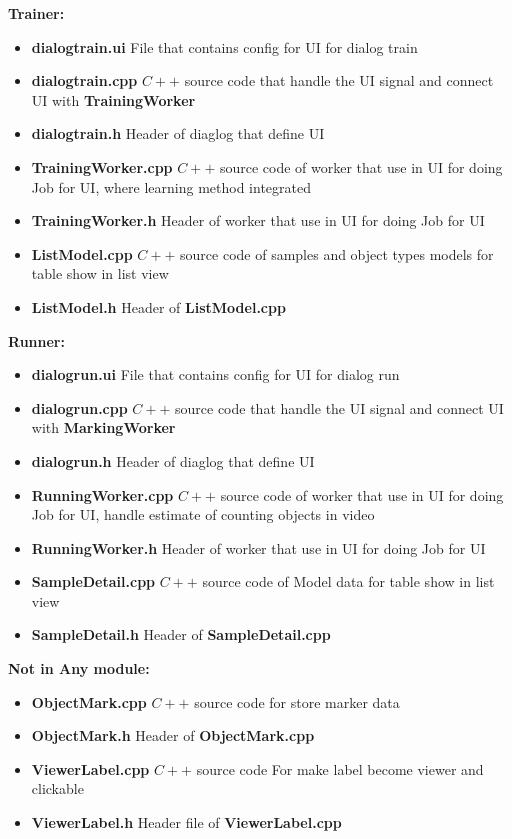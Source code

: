\textbf{Trainer: }
\begin{itemize}
  \item \textbf{dialogtrain.ui} File that contains config for UI for dialog train
  \item \textbf{dialogtrain.cpp} $C++$ source code that handle the UI signal and connect UI with \textbf{TrainingWorker}
  \item \textbf{dialogtrain.h} Header of diaglog that define UI
  \item \textbf{TrainingWorker.cpp} $C++$ source code of worker that use in UI for doing Job for UI, where learning method integrated 
  \item \textbf{TrainingWorker.h} Header of worker that use in UI for doing Job for UI
  \item \textbf{ListModel.cpp} $C++$ source code of samples and object types models for table show in list view 
  \item \textbf{ListModel.h} Header of \textbf{ListModel.cpp}
\end{itemize}

\textbf{Runner: }
\begin{itemize}
  \item \textbf{dialogrun.ui} File that contains config for UI for dialog run
  \item \textbf{dialogrun.cpp} $C++$ source code that handle the UI signal and connect UI with \textbf{MarkingWorker}
  \item \textbf{dialogrun.h} Header of diaglog that define UI
  \item \textbf{RunningWorker.cpp} $C++$ source code of worker that use in UI for doing Job for UI, handle estimate of counting objects in video 
  \item \textbf{RunningWorker.h} Header of worker that use in UI for doing Job for UI
  \item \textbf{SampleDetail.cpp} $C++$ source code of Model data for table show in list view 
  \item \textbf{SampleDetail.h} Header of \textbf{SampleDetail.cpp}
\end{itemize}

\textbf{Not in Any module: }
\begin{itemize}
  \item \textbf{ObjectMark.cpp} $C++$ source code for store marker data 
  \item \textbf{ObjectMark.h} Header of \textbf{ObjectMark.cpp}
  \item \textbf{ViewerLabel.cpp} $C++$ source code For make label become viewer and clickable 
  \item \textbf{ViewerLabel.h} Header file of \textbf{ViewerLabel.cpp}
\end{itemize}


